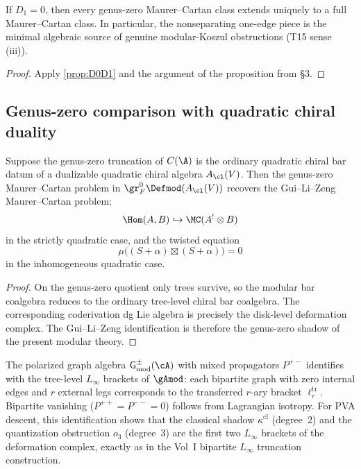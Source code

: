 \begin{corollary}
If $D_1=0$, then every genus-zero Maurer--Cartan class extends uniquely to a full
Maurer--Cartan class. In particular, the nonseparating one-edge piece is the minimal
algebraic source of genuine modular-Koszul obstructions (T15 sense (iii)).
\end{corollary}

\begin{proof}
Apply \cref{prop:D0D1} and the argument of the proposition from \S3.
\end{proof}

\subsection{Genus-zero comparison with quadratic chiral duality}

\begin{proposition}
Suppose the genus-zero truncation of $C(\A)$ is the ordinary quadratic chiral bar datum
of a dualizable quadratic chiral algebra $A_{\cl}(V)$. Then the genus-zero Maurer--Cartan
problem in $\gr_F^0\Defmod(A_{\cl}(V))$ recovers the Gui--Li--Zeng Maurer--Cartan problem:
\[
\Hom(A,B)\hookrightarrow \MC(A^!\otimes B)
\]
in the strictly quadratic case, and the twisted equation
\[
\mu\big((S+\alpha)\boxtimes (S+\alpha)\big)=0
\]
in the inhomogeneous quadratic case.
\end{proposition}

\begin{proof}
On the genus-zero quotient only trees survive, so the modular bar coalgebra reduces to the
ordinary tree-level chiral bar coalgebra. The corresponding coderivation dg Lie algebra is
precisely the disk-level deformation complex. The Gui--Li--Zeng identification is therefore
the genus-zero shadow of the present modular theory.
\end{proof}

\begin{construction}
\label{constr:vol2-bipartite-linfty}
The polarized graph algebra $\mathsf{G}^{\pm}_{\mathrm{mod}}(\cA)$ with mixed propagators $P^{+-}$ identifies with the tree-level $L_\infty$ brackets of $\gAmod$: each bipartite graph with zero internal edges and $r$ external legs corresponds to the transferred $r$-ary bracket $\ell_r^{\mathrm{tr}}$. Bipartite vanishing ($P^{++} = P^{--} = 0$) follows from Lagrangian isotropy. For PVA descent, this identification shows that the classical shadow $\kappa^{\mathrm{cl}}$ (degree~$2$) and the quantization obstruction $o_3$ (degree~$3$) are the first two $L_\infty$ brackets of the deformation complex, exactly as in the Vol~I bipartite $L_\infty$ truncation construction.
\end{construction}

